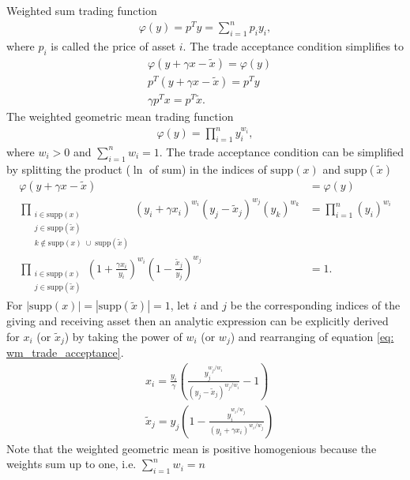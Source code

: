 Weighted sum trading function
\begin{align}
    \varphi(y) = p^{T}y = \sum_{i=1}^{n} p_i y_i, \label{eq: weighted_sum}
\end{align}
where $p_i$ is called the price of asset $i$. The trade acceptance condition
simplifies to
\begin{align}
    &\varphi(y+\gamma x- \tilde{x}) = \varphi(y) \nonumber \\
    &p^{T} (y +\gamma x - \tilde{x}) = p^{T} y \nonumber \\
    &\gamma p^{T} x = p^{T} \tilde{x}.
\end{align}
The weighted geometric mean trading function
\begin{align}
    \varphi(y) = \prod_{i=1}^{n} y_i^{w_i}, \label{eq: weighted_geo_mean}
\end{align}
where $w_i > 0 $ and $\sum_{i=1}^{n} w_i=1$. The trade acceptance condition can be
simplified by splitting the product ($\ln$ of sum) in the indices of
$\text{supp}(x)$ and $\text{supp}(\tilde{x})$
\begin{align}
    \varphi(y+\gamma x- \tilde{x}) &= \varphi(y) \nonumber \\
    \prod\limits_{\substack{i \in \text{supp}(x) \\
    j \in \text{supp}(\tilde{x}) \\
    k \notin \text{supp}(x)\; \cup\; \text{supp}(\tilde{x})  }}
    (y_i + \gamma x_i)^{w_i}
    (y_j - \tilde{x}_j)^{w_j}
    (y_k)^{w_k} &= \prod_{i=1}^{n} (y_i)^{w_i} \nonumber\\
    \prod\limits_{\substack{i \in \text{supp}(x) \\
    j \in \text{supp}(\tilde{x})}}
    \left(1 + \frac{\gamma x_i}{y_i}\right)^{w_i}
    \left(1 - \frac{\tilde{x}_j}{y_j}\right)^{w_j}
    &= 1.\label{eq: wm_trade_acceptance}
\end{align}
For $|\text{supp}(x)| = |\text{supp}(\tilde{x})| = 1$, let $i$ and $j$ be the
corresponding indices of the giving and receiving asset then an analytic
expression can be explicitly derived  for $x_i$ (or $\tilde{x}_j$) by
taking the power of $w_i$ (or $w_j$) and rearranging of equation
\ref{eq: wm_trade_acceptance}.
\begin{align}
&x_i = \frac{y_i}{\gamma}\left(
\frac{y_j^{w_j/w_i}}{\left(y_j - \tilde{x}_j \right)^{w_j/w_i}} - 1
\right) \label{eq: gm_fef}\\
&\tilde{x}_j= y_j\left(
    1 - \frac{y_i^{w_i/w_j}}{\left(y_i+\gamma x_i\right)^{w_i/w_j} }
\right) \label{eq: gm_ref}
\end{align}
Note that the weighted geometric mean is positive homogenious because the
weights sum up to one, i.e. $\sum_{i=1}^{n}w_i = n $


